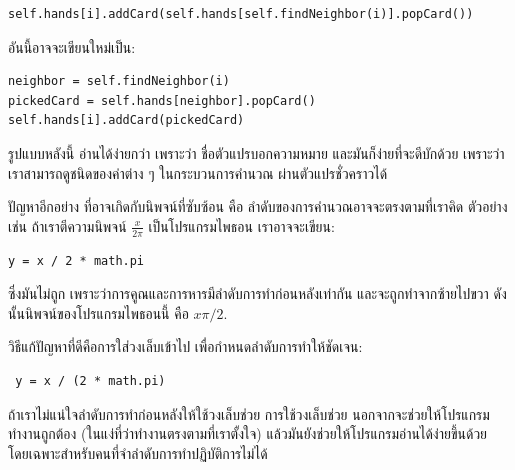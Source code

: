 \begin{verbatim}
self.hands[i].addCard(self.hands[self.findNeighbor(i)].popCard())
\end{verbatim}
%
อันนี้อาจจะเขียนใหม่เป็น:

\begin{verbatim}
neighbor = self.findNeighbor(i)
pickedCard = self.hands[neighbor].popCard()
self.hands[i].addCard(pickedCard)
\end{verbatim}
%
%
รูปแบบหลังนี้ อ่านได้ง่ายกว่า
เพราะว่า
ชื่อตัวแปรบอกความหมาย
และมันก็ง่ายที่จะดีบักด้วย
เพราะว่า เราสามารถดูชนิดของค่าต่าง ๆ ในกระบวนการคำนวณ ผ่านตัวแปรชั่วคราวได้


ปัญหาอีกอย่าง ที่อาจเกิดกับนิพจน์ที่ซับซ้อน
คือ ลำดับของการคำนวณอาจจะตรงตามที่เราคิด
ตัวอย่างเช่น
ถ้าเราตีความนิพจน์
{\scriptsize$\frac{x}{2 \pi}$} 
เป็นโปรแกรมไพธอน
เราอาจจะเขียน:

\begin{verbatim}
y = x / 2 * math.pi
\end{verbatim}
%
%
ซึ่งมันไม่ถูก
เพราะว่าการคูณและการหารมีลำดับการทำก่อนหลังเท่ากัน
และจะถูกทำจากซ้ายไปขวา
ดังนั้นนิพจน์ของโปรแกรมไพธอนนี้ คือ {\scriptsize$x \pi / 2$}.


วิธีแก้ปัญหาที่ดีคือการใส่วงเล็บเข้าไป เพื่อกำหนดลำดับการทำให้ชัดเจน:

\begin{verbatim}
 y = x / (2 * math.pi)
\end{verbatim}
%
%
ถ้าเราไม่แน่ใจลำดับการทำก่อนหลังให้ใช้วงเล็บช่วย
การใช้วงเล็บช่วย
นอกจากจะช่วยให้โปรแกรมทำงานถูกต้อง (ในแง่ที่ว่าทำงานตรงตามที่เราตั้งใจ)
แล้วมันยังช่วยให้โปรแกรมอ่านได้ง่ายขึ้นด้วย
โดยเฉพาะสำหรับคนที่จำลำดับการทำปฏิบัติการไม่ได้



